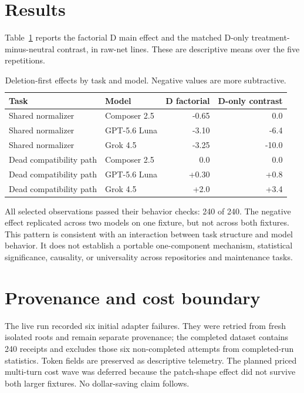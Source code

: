 \documentclass[11pt]{article}
\begin{document}
\section{Results}
Table~\ref{tab:effects} reports the factorial D main effect and the matched
D-only treatment-minus-neutral contrast, in raw-net lines. These are descriptive
means over the five repetitions.

\begin{table}[ht]
\centering
\caption{Deletion-first effects by task and model. Negative values are more subtractive.}
\label{tab:effects}
\begin{tabular}{llrr}
\toprule
Task & Model & D factorial & D-only contrast \\
\midrule
Shared normalizer & Composer 2.5 & -0.65 & 0.0 \\
Shared normalizer & GPT-5.6 Luna & -3.10 & -6.4 \\
Shared normalizer & Grok 4.5 & -3.25 & -10.0 \\
Dead compatibility path & Composer 2.5 & 0.0 & 0.0 \\
Dead compatibility path & GPT-5.6 Luna & +0.30 & +0.8 \\
Dead compatibility path & Grok 4.5 & +2.0 & +3.4 \\
\bottomrule
\end{tabular}
\end{table}

All selected observations passed their behavior checks: 240 of 240. The
negative effect replicated across two models on one fixture, but not across
both fixtures. This pattern is consistent with an interaction between task
structure and model behavior. It does not establish a portable one-component
mechanism, statistical significance, causality, or universality across
repositories and maintenance tasks.

\section{Provenance and cost boundary}
The live run recorded six initial adapter failures. They were retried from
fresh isolated roots and remain separate provenance; the completed dataset
contains 240 receipts and excludes those six non-completed attempts from
completed-run statistics. Token fields are preserved as descriptive telemetry.
The planned priced multi-turn cost wave was deferred because the patch-shape
effect did not survive both larger fixtures. No dollar-saving claim follows.
\end{document}
